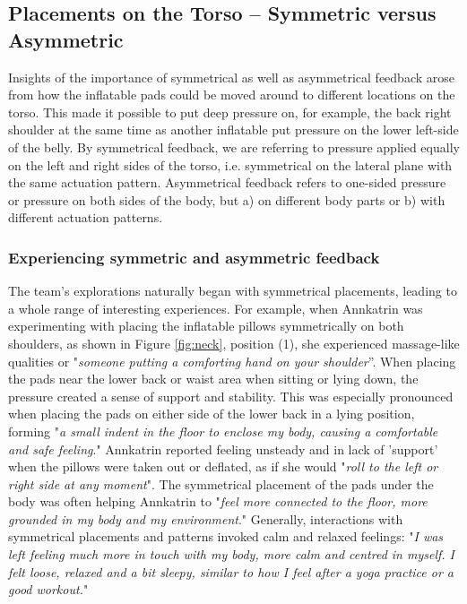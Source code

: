 \subsection{Placements on the Torso -- Symmetric versus Asymmetric}

Insights of the importance of symmetrical as well as asymmetrical feedback arose from how the inflatable pads could be moved around to different locations on the torso. This made it possible to put deep pressure on, for example, the back right shoulder at the same time as another inflatable put pressure on the lower left-side of the belly. By symmetrical feedback, we are referring to pressure applied equally on the left and right sides of the torso, i.e. symmetrical on the lateral plane with the same actuation pattern. Asymmetrical feedback refers to one-sided pressure or pressure on both sides of the body, but a) on different body parts or b) with different actuation patterns.


\subsubsection{Experiencing symmetric and asymmetric feedback}

The team's explorations naturally began with symmetrical placements, leading to a whole range of interesting experiences. For example, when Annkatrin was experimenting with placing the inflatable pillows symmetrically on both shoulders, as shown in Figure \ref{fig:neck}, position (1), she experienced massage-like qualities or "\textit{someone putting a comforting hand on your shoulder}”. When placing the pads near the lower back or waist area when sitting or lying down, the pressure created a sense of support and stability. This was especially pronounced when placing the pads on either side of the lower back in a lying position, forming "\textit{a small indent in the floor to enclose my body, causing a comfortable and safe feeling}." Annkatrin reported feeling unsteady and in lack of 'support' when the pillows were taken out or deflated, as if she would "\textit{roll to the left or right side at any moment}". The symmetrical placement of the pads under the body was often helping Annkatrin to "\textit{feel more connected to the floor, more grounded in my body and my environment}." Generally, interactions with symmetrical placements and patterns invoked calm and relaxed feelings: "\textit{I was left feeling much more in touch with my body, more calm and centred in myself. I felt loose, relaxed and a bit sleepy, similar to how I feel after a yoga practice or a good workout.}" 

